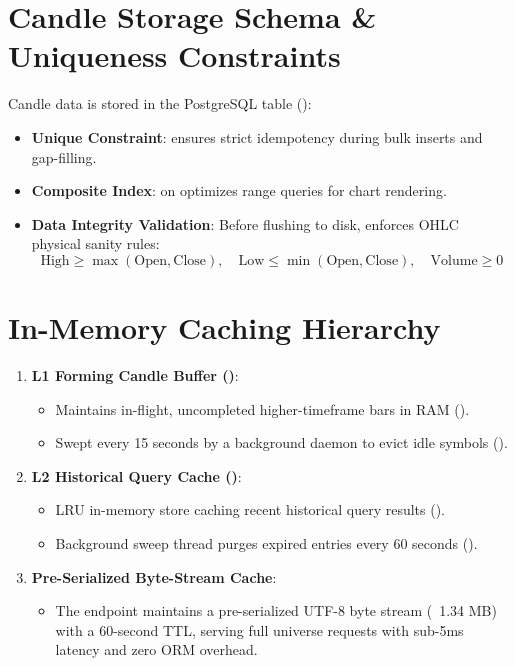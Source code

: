 \section{Candle Storage Schema \& Uniqueness Constraints}
Candle data is stored in the PostgreSQL  table ():
\begin{itemize}[leftmargin=6mm,itemsep=1.5mm]
    \item \textbf{Unique Constraint}:  ensures strict idempotency during bulk inserts and gap-filling.
    \item \textbf{Composite Index}:  on  optimizes range queries for chart rendering.
    \item \textbf{Data Integrity Validation}: Before flushing to disk,  enforces OHLC physical sanity rules:
    \begin{equation}
        \mathrm{High} \ge \max(\mathrm{Open}, \mathrm{Close}), \quad \mathrm{Low} \le \min(\mathrm{Open}, \mathrm{Close}), \quad \mathrm{Volume} \ge 0
    \end{equation}
\end{itemize}

\section{In-Memory Caching Hierarchy}
\begin{enumerate}[leftmargin=6mm,itemsep=2mm]
    \item \textbf{L1 Forming Candle Buffer ()}:
    \begin{itemize}[leftmargin=4mm]
        \item Maintains in-flight, uncompleted higher-timeframe bars in RAM ().
        \item Swept every 15 seconds by a background daemon to evict idle symbols ().
    \end{itemize}
    \item \textbf{L2 Historical Query Cache ()}:
    \begin{itemize}[leftmargin=4mm]
        \item LRU in-memory store caching recent historical query results ().
        \item Background sweep thread purges expired entries every 60 seconds ().
    \end{itemize}
    \item \textbf{Pre-Serialized Byte-Stream Cache}:
    \begin{itemize}[leftmargin=4mm]
        \item The  endpoint maintains a pre-serialized UTF-8 byte stream (~1.34 MB) with a 60-second TTL, serving full universe requests with sub-5ms latency and zero ORM overhead.
    \end{itemize}
\end{enumerate}
